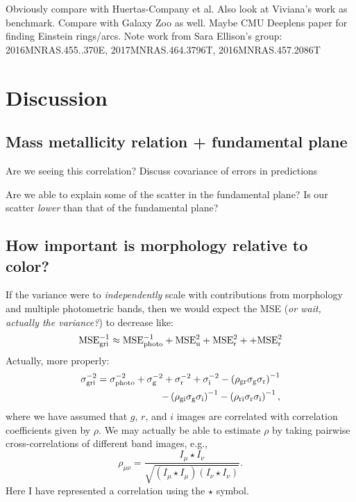\documentclass[fleqn,usenatbib]{mnras}
\begin{document}
Obviously compare with Huertas-Company et al.
Also look at Viviana's work as benchmark.
Compare with Galaxy Zoo as well.
Maybe CMU Deeplens paper for finding Einstein rings/arcs.
Note work from Sara Ellison's group:
2016MNRAS.455..370E, 2017MNRAS.464.3796T, 2016MNRAS.457.2086T

\section{Discussion} \label{sec:discussion}


\subsection{Mass metallicity relation + fundamental plane}
Are we seeing this correlation? Discuss covariance of errors in predictions

Are we able to explain some of the scatter in the fundamental plane? Is our scatter \textit{lower} than that of the fundamental plane?


\subsection{How important is morphology relative to color?}
If the variance were to \textit{independently} scale with contributions from morphology and multiple photometric bands, then we would expect the MSE (\textit{or wait, actually the variance?}) to decrease like:
\begin{equation}
	{\rm MSE_{\rm gri}^{-1}} \approx {\rm MSE_{\rm photo}^{-1} + MSE_{\rm u}^2 + MSE_{\rm r}^2 + + MSE_{\rm r}^2}
\end{equation}
Actually, more properly:
\begin{eqnarray}
	\sigma_{\rm gri}^{-2} = \sigma_{\rm photo}^{-2} + \sigma_{\rm g}^{-2} + \sigma_{\rm r}^{-2} + \sigma_{\rm i}^{-2}
	- \left (\rho_{\rm gr}\sigma_{\rm g}\sigma_{\rm r}\right )^{-1} \nonumber\\
	- \left (\rho_{\rm gi}\sigma_{\rm g}\sigma_{\rm i}\right )^{-1}
	- \left (\rho_{\rm ri}\sigma_{\rm r}\sigma_{\rm i}\right )^{-1},
\end{eqnarray}
where we have assumed that $g$, $r$, and $i$ images are correlated with correlation coefficients given by $\rho$.
We may actually be able to estimate $\rho$ by taking pairwise cross-correlations of different band images, e.g.,
\begin{equation}
\rho_{\mu \nu} = \frac{I_\mu \star I_\nu }{\sqrt{\left (I_\mu \star I_\mu \right ) \left (I_\nu \star I_\nu\right )}}.
\end{equation}
Here I have represented a correlation using the $\star$ symbol.
\end{document}
